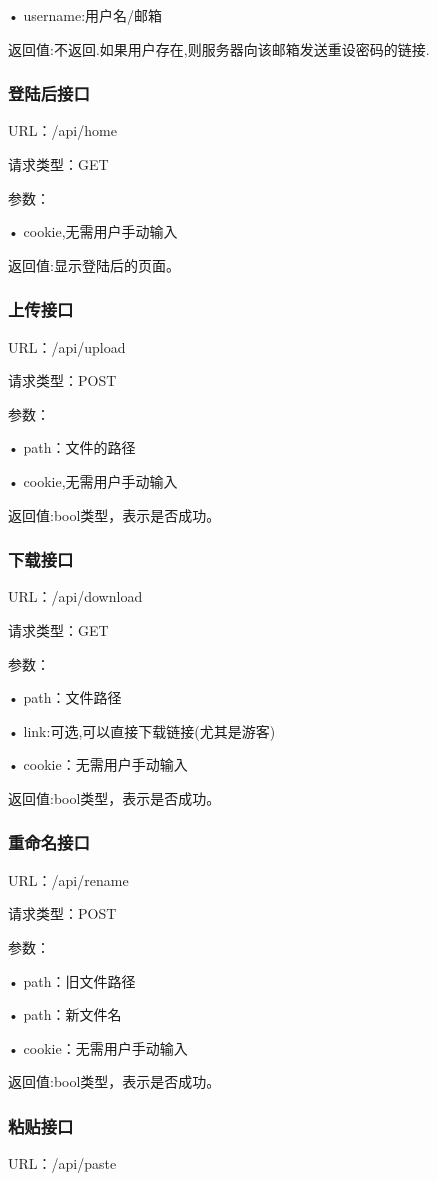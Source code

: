 • username:用户名/邮箱

返回值:不返回.如果用户存在,则服务器向该邮箱发送重设密码的链接.

\subsubsection{登陆后接口}
URL：/api/home

请求类型：GET

参数：

• cookie,无需用户手动输入

返回值:显示登陆后的页面。

\subsubsection{上传接口}
URL：/api/upload

请求类型：POST

参数：

• path：文件的路径

• cookie,无需用户手动输入

返回值:bool类型，表示是否成功。

\subsubsection{下载接口}
URL：/api/download

请求类型：GET

参数：

• path：文件路径

• link:可选,可以直接下载链接(尤其是游客)

• cookie：无需用户手动输入

返回值:bool类型，表示是否成功。

\subsubsection{重命名接口}
URL：/api/rename

请求类型：POST
 
参数：

• path：旧文件路径

• path：新文件名

• cookie：无需用户手动输入

返回值:bool类型，表示是否成功。

\subsubsection{粘贴接口}
URL：/api/paste

